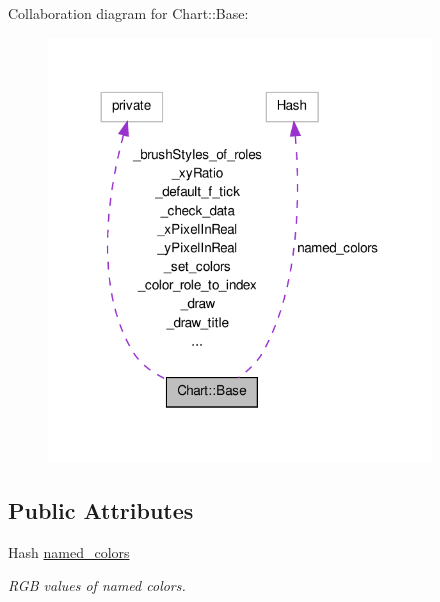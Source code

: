 Collaboration diagram for Chart::Base:\nopagebreak
\begin{figure}[H]
\begin{center}
\leavevmode
\includegraphics[width=288pt]{classChart_1_1Base__coll__graph}
\end{center}
\end{figure}
\subsection*{Public Attributes}
\begin{DoxyCompactItemize}
\item 
Hash \hyperlink{classChart_1_1Base_a38c2792df08724efa7c4e1b9194cbe6e}{named\_\-colors}
\begin{DoxyCompactList}\small\item\em RGB values of named colors. \item\end{DoxyCompactList}\end{DoxyCompactItemize}
